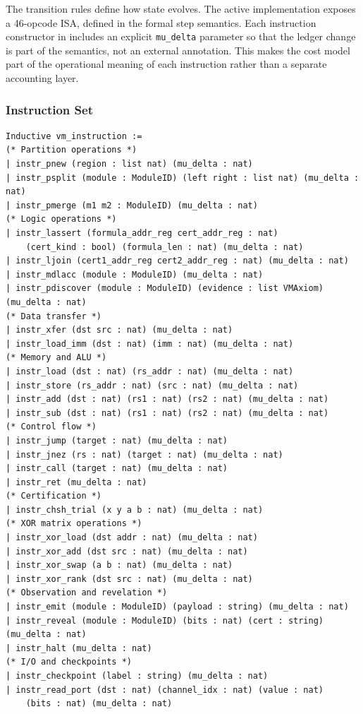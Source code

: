 The transition rules define how state evolves. The active implementation exposes a 46-opcode ISA, defined in the formal step semantics.
Each instruction constructor in  includes an explicit \texttt{mu\_delta} parameter so that the ledger change is part of the semantics, not an external annotation. This makes the cost model part of the operational meaning of each instruction rather than a separate accounting layer.

\subsubsection{Instruction Set}

\begin{lstlisting}
Inductive vm_instruction :=
(* Partition operations *)
| instr_pnew (region : list nat) (mu_delta : nat)
| instr_psplit (module : ModuleID) (left right : list nat) (mu_delta : nat)
| instr_pmerge (m1 m2 : ModuleID) (mu_delta : nat)
(* Logic operations *)
| instr_lassert (formula_addr_reg cert_addr_reg : nat)
    (cert_kind : bool) (formula_len : nat) (mu_delta : nat)
| instr_ljoin (cert1_addr_reg cert2_addr_reg : nat) (mu_delta : nat)
| instr_mdlacc (module : ModuleID) (mu_delta : nat)
| instr_pdiscover (module : ModuleID) (evidence : list VMAxiom) (mu_delta : nat)
(* Data transfer *)
| instr_xfer (dst src : nat) (mu_delta : nat)
| instr_load_imm (dst : nat) (imm : nat) (mu_delta : nat)
(* Memory and ALU *)
| instr_load (dst : nat) (rs_addr : nat) (mu_delta : nat)
| instr_store (rs_addr : nat) (src : nat) (mu_delta : nat)
| instr_add (dst : nat) (rs1 : nat) (rs2 : nat) (mu_delta : nat)
| instr_sub (dst : nat) (rs1 : nat) (rs2 : nat) (mu_delta : nat)
(* Control flow *)
| instr_jump (target : nat) (mu_delta : nat)
| instr_jnez (rs : nat) (target : nat) (mu_delta : nat)
| instr_call (target : nat) (mu_delta : nat)
| instr_ret (mu_delta : nat)
(* Certification *)
| instr_chsh_trial (x y a b : nat) (mu_delta : nat)
(* XOR matrix operations *)
| instr_xor_load (dst addr : nat) (mu_delta : nat)
| instr_xor_add (dst src : nat) (mu_delta : nat)
| instr_xor_swap (a b : nat) (mu_delta : nat)
| instr_xor_rank (dst src : nat) (mu_delta : nat)
(* Observation and revelation *)
| instr_emit (module : ModuleID) (payload : string) (mu_delta : nat)
| instr_reveal (module : ModuleID) (bits : nat) (cert : string) (mu_delta : nat)
| instr_halt (mu_delta : nat)
(* I/O and checkpoints *)
| instr_checkpoint (label : string) (mu_delta : nat)
| instr_read_port (dst : nat) (channel_idx : nat) (value : nat)
    (bits : nat) (mu_delta : nat)

\end{lstlisting}
